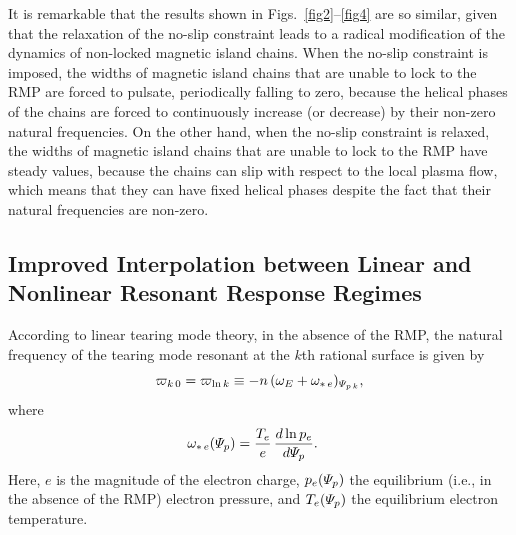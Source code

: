 \documentclass[12pt,prb,aps]{revtex4-1}
\begin{document}
It is remarkable that the results shown in Figs.~\ref{fig2}--\ref{fig4} are so similar, given that the relaxation of the no-slip constraint leads to a
radical modification of the dynamics of non-locked magnetic island chains. When the no-slip constraint is imposed, the widths of magnetic island chains that are
unable to lock to the RMP are forced to pulsate, periodically falling to zero, because the helical phases of the chains are forced to
continuously increase (or decrease) by their non-zero natural frequencies.\cite{rfb,rfc,rfisland,rf1,pulse} On the other hand, when the no-slip
constraint is relaxed, the widths of magnetic island chains that are unable to lock to the RMP have steady values, because the  chains can
slip with respect to the local plasma flow, which means that they can have fixed helical phases despite the fact that their natural
frequencies are non-zero. 

\subsection{Improved Interpolation between Linear and Nonlinear Resonant Response Regimes}\label{s4b}
According to linear tearing mode theory, in the absence of the RMP, the natural frequency of the tearing mode resonant at the $k$th rational surface is given by\,\cite{ara,lin1,lin2,lin3}
\begin{equation}\label{elin}
\varpi_{k\,0} = \varpi_{{\rm ln}\,k} \equiv - n\,(\omega_E+\omega_{\ast\,e})_{{\mit\Psi}_{p\,k}},
\end{equation}
where
\begin{align}
\omega_{\ast\,e}({\mit\Psi}_p) &=\frac{T_e}{e}\,\frac{d\ln p_e}{d{\mit\Psi}_p}.
\end{align}
 Here,  $e$ is the magnitude of the electron charge,  $p_e({\mit\Psi}_p)$  the equilibrium (i.e., in the absence of the RMP)
electron pressure, and $T_e({\mit\Psi}_p)$ the equilibrium
electron temperature.
\end{document}
